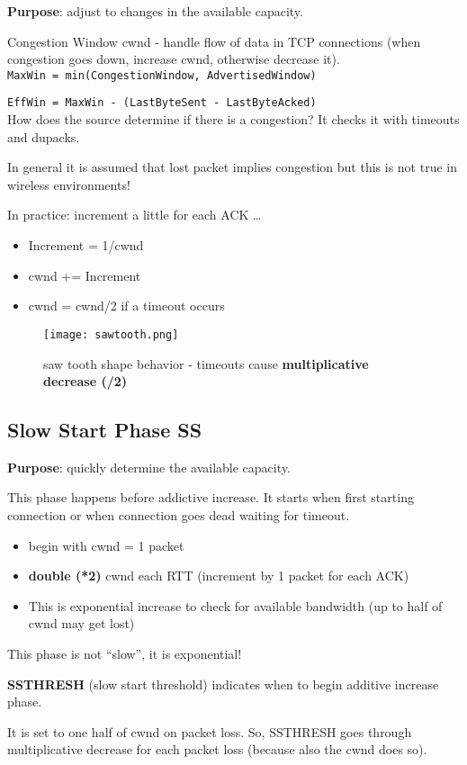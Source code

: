 \textbf{Purpose}: adjust to changes in the available capacity.

Congestion Window cwnd - handle flow of data in TCP connections (when
congestion goes down, increase cwnd, otherwise decrease it). \\

\texttt{MaxWin = min(CongestionWindow, AdvertisedWindow)}

\texttt{EffWin = MaxWin - (LastByteSent - LastByteAcked)} \\

How does the source determine if there is a congestion? It checks it with
timeouts and dupacks.

In general it is assumed that lost packet implies congestion but this is
not true in wireless environments!

In practice: increment a little for each ACK \dots

\begin{itemize}
  \item Increment = 1/cwnd
  \item cwnd += Increment
  \item cwnd = cwnd/2 if a timeout occurs
\end{itemize}

\begin{figure}[H]
\texttt{[image: sawtooth.png]}
\caption{saw tooth shape behavior - timeouts cause \textbf{multiplicative
decrease (/2)}}
\end{figure}

\subsection{Slow Start Phase SS}

\textbf{Purpose}: quickly determine the available capacity.

This phase happens before addictive increase. It starts when first
starting connection or when connection goes dead waiting for timeout.

\begin{itemize}
  \item begin with cwnd = 1 packet
  \item \textbf{double (*2)} cwnd each RTT (increment by 1 packet for each ACK)
  \item This is exponential increase to check for available bandwidth
(up to half of cwnd may get lost)
\end{itemize}

This phase is not ``slow'', it is exponential!

\textbf{SSTHRESH} (slow start threshold) indicates when to begin additive
increase phase.

It is set to one half of cwnd on packet loss. So, SSTHRESH goes through
multiplicative decrease for each packet loss (because also the cwnd does so).
